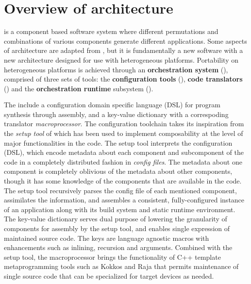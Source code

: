 \chapter{Overview of \flashx architecture}
\label{Chp:Architecture}

\flashx is a component based software system where different
permutations and combinations of various components generate different
applications. Some aspects of \flashx architecture are adapted 
from \flash \cite{Dubey2009}, but it is fundamentally a new software with a new
architecture designed for use with heterogeneous
platforms. Portability on heterogeneous platforms is achieved through an
\textbf{orchestration system} (\OS), comprised of three sets of tools: the
  \textbf{configuration tools} (\CFT), \textbf{code translators} (\CT)
  and the \textbf{orchestration runtime} subsystem (\OR).

  The {\CFT} include a configuration domain specific language (DSL) for program
synthesis through assembly, and a key-value dictionary with a correspoding translator {\it
  macroprocessor}. The configuration toolchain takes its inspiration from the {\it setup
  tool} of {\flash} \citep{Dubey2009} which has been used to implement
composability at the level of major functionalities in the code.  The
setup tool interprets the configuration (DSL), which encode metadata about each component
and  subcomponent of the code in a completely distributed fashion in
{\it config files}. The metadata about one component is completely
oblivious of the metadata about other components, though it has
some knowledge of the components that are available in the code. The
setup tool recursively parses the config file of each mentioned
component, assimilates the information, and assembles a consistent,
fully-configured instance of an application along with its build
system and static runtime environment. The key-value dictionary serves
dual purpose of lowering the granularity of components for assembly by
the setup tool, and enables single expression of maintained source
code. The keys are language agnostic macros with enhancements such as
inlining, recursion and arguments. Combined with the setup tool, the
macroprocessor brings the functionality of C++ template
metaprogramming tools such as Kokkos and Raja that permits 
maintenance of single source code that can be specialized for target
devices as needed.


